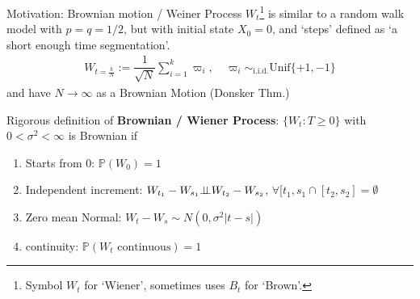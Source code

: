 Motivation: Brownian motion / Weiner Process $ W_t $\footnote{Symbol $ W_t $ for `Wiener', sometimes uses $ B_t $ for `Brown'.} is similar to a random walk model with $ p=q=1/2 $, but with initial state $ X_0=0 $, and `steps' defined as `a short enough time segmentation'.
\begin{align}
    W_{t=\frac{k}{N}}:= \dfrac{1}{\sqrt{N}} \sum_{i=1}^k \varpi _i,\quad \varpi _i\sim_{\mathrm{i.i.d.} } \mathrm{Unif}\{+1,-1\} 
\end{align}
and have $ N\to \infty $ as a Brownian Motion (Donsker Thm.)

Rigorous definition of \textbf{Brownian / Wiener Process}: $ \{W_t:T\geq 0\} $ with $ 0<\sigma ^2<\infty $ is Brownian if
\begin{enumerate}[topsep=2pt,itemsep=2pt]
    \item Starts from $ 0 $: $ \mathbb{P}\left( W_0 \right) =1 $
    \item Independent increment: $ W_{t_1}-W_{s_1}\bot\!\!\!\bot W_{t_2}-W_{s_2} $, $  \forall [t_1,s_1\cap [t_2,s_2]=\emptyset $
    \item Zero mean Normal: $ W_t-W_s\sim N(0,\sigma ^2\vert t-s\vert) $
    \item continuity: $ \mathbb{P}\left( W_t\text{ continuous} \right) =1 $ 
\end{enumerate}

